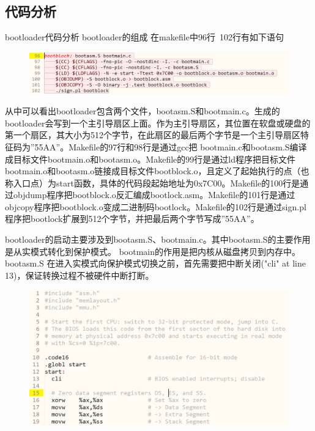 \documentclass[a4paper,12pt]{report}
\begin{document}
\subsection{代码分析}
bootloader代码分析
bootloader的组成
在makefile中96行~102行有如下语句
\begin{figure}[H]
	\centering
	\includegraphics [width=1.0\textwidth]{figure//image88.png}
\end{figure}
从中可以看出bootloader包含两个文件，bootasm.S和bootmain.c。生成的bootloader会写到一个主引导扇区上面。作为主引导扇区，其位置在软盘或硬盘的第一个扇区，其大小为512个字节，在此扇区的最后两个字节是一个主引导扇区特征码为”55AA”。Makefile的97行和98行是通过gcc把 bootmain.c和bootasm.S编译成目标文件bootmain.o和bootasm.o。Makefile的99行是通过ld程序把目标文件bootmain.o和bootasm.o链接成目标文件bootblock.o，且定义了起始执行的点（也称入口点）为start函数，具体的代码段起始地址为0x7C00。Makefile的100行是通过objdump程序把bootblock.o反汇编成bootlock.asm。Makefile的101行是通过objcopy程序把bootblock.o变成二进制码bootlock。Makefile的102行是通过sign.pl程序把bootlock扩展到512个字节，并把最后两个字节写成”55AA”。


bootloader的启动主要涉及到bootasm.S、bootmain.c。其中bootasm.S的主要作用是从实模式转化到保护模式。 bootmain的作用是把内核从磁盘拷贝到内存中。
bootasm.S
在进入实模式向保护模式切换之前，首先需要把中断关闭("cli" at line 13)，保证转换过程不被硬件中断打断。
\begin{figure}[H]
	\centering
	\includegraphics [width=1.0\textwidth]{figure//image89.png}
\end{figure}
\end{document}
